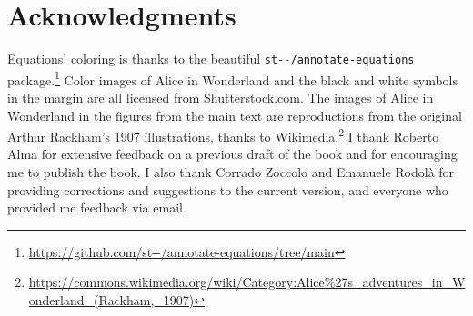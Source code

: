 \section*{Acknowledgments}
%
Equations' coloring is thanks to the beautiful {\footnotesize\verb+st--/annotate-equations+}
package.\footnote{\url{https://github.com/st--/annotate-equations/tree/main}} Color images of Alice in Wonderland and the black and white symbols in the margin are all licensed from Shutterstock.com. The images of Alice in Wonderland in the figures from the main text are reproductions from the original Arthur Rackham's 1907 illustrations, thanks to Wikimedia.\footnote{\url{ https://commons.wikimedia.org/wiki/Category:Alice\%27s\_adventures\_in\_Wonderland\_(Rackham,\_1907)}} I thank Roberto Alma for extensive feedback on a previous draft of the book and for encouraging me to publish the book. I also thank Corrado Zoccolo and Emanuele Rodolà for providing corrections and suggestions to the current version, and everyone who provided me feedback via email.